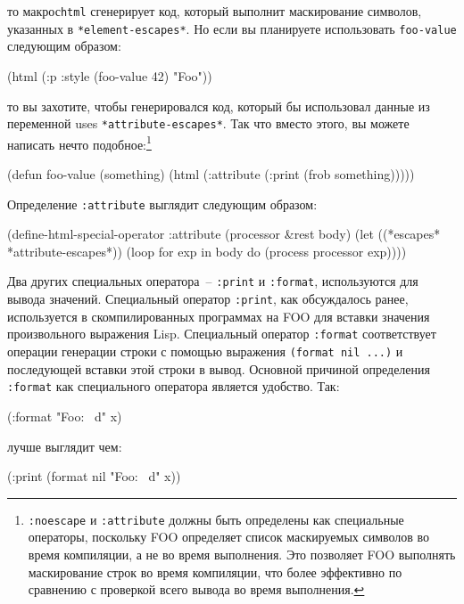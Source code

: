 то макрос\lstinline{html} сгенерирует код, который выполнит маскирование символов, указанных в
\lstinline{*element-escapes*}.  Но если вы планируете использовать \lstinline{foo-value} следующим
образом:

\begin{myverb}
(html (:p :style (foo-value 42) "Foo"))
\end{myverb}

то вы захотите, чтобы генерировался код, который бы использовал данные из переменной uses
\lstinline{*attribute-escapes*}.  Так что вместо этого, вы можете написать нечто
подобное:\footnote{\lstinline{:noescape} и \lstinline{:attribute} должны быть определены как
  специальные операторы, поскольку FOO определяет список маскируемых символов во время
  компиляции, а не во время выполнения.  Это позволяет FOO выполнять маскирование строк во
  время компиляции, что более эффективно по сравнению с проверкой всего вывода во время
  выполнения.}

\begin{myverb}
(defun foo-value (something)
  (html (:attribute (:print (frob something)))))
\end{myverb}

Определение \lstinline{:attribute} выглядит следующим образом:

\begin{myverb}
(define-html-special-operator :attribute (processor &rest body)
  (let ((*escapes* *attribute-escapes*))
    (loop for exp in body do (process processor exp))))
\end{myverb}

Два других специальных оператора~-- \lstinline{:print} и \lstinline{:format}, используются для
вывода значений.  Специальный оператор \lstinline{:print}, как обсуждалось ранее, используется
в скомпилированных программах на FOO для вставки значения произвольного выражения Lisp.
Специальный оператор \lstinline{:format} соответствует операции генерации строки с помощью
выражения \lstinline{(format nil ...)} и последующей вставки этой строки в вывод.  Основной
причиной определения \lstinline{:format} как специального оператора является удобство.  Так:

\begin{myverb}
(:format "Foo: ~d" x)
\end{myverb}

лучше выглядит чем:

\begin{myverb}
(:print (format nil "Foo: ~d" x))
\end{myverb}

